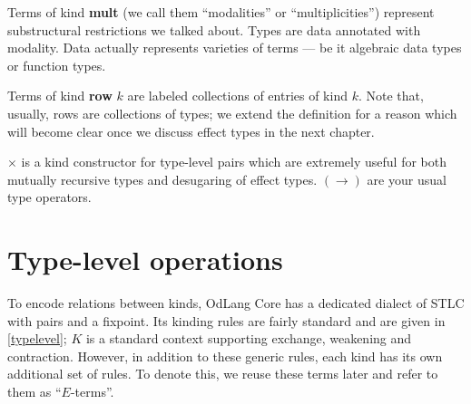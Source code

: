 \documentclass[a4paper,14pt]{extreport}
\begin{document}
Terms of kind \textbf{mult} (we call them ``modalities'' or ``multiplicities'')
represent substructural restrictions we talked about. Types are data
annotated with modality. Data actually represents varieties of terms --- be
it algebraic data types or function types.

Terms of kind \textbf{row} $k$ are labeled collections of entries of kind $k$.
Note that, usually, rows are collections of types; we extend the definition for
a reason which will become clear once we discuss effect types in the next
chapter.

$\times$ is a kind constructor for type-level pairs which are extremely useful
for both mutually recursive types and desugaring of effect types. $(\to)$ are
your usual type operators.

\section{Type-level operations}

To encode relations between kinds, OdLang Core has a dedicated dialect of STLC
with pairs and a fixpoint. Its kinding rules are fairly standard and are given
in \ref{typelevel}; $K$ is a standard context supporting exchange, weakening and
contraction. However, in addition to these generic rules, each kind has its own
additional set of rules. To denote this, we reuse these terms later and refer to
them as ``$E$-terms''.
\end{document}
